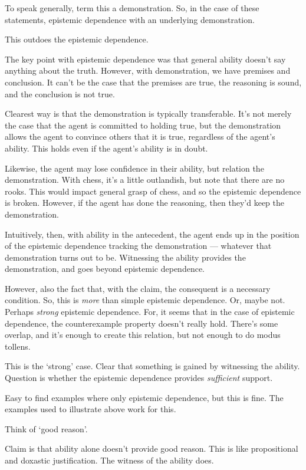 \documentclass[10pt]{article}
\begin{document}
To speak generally, term this a demonstration.
So, in the case of these statements, epistemic dependence with an underlying demonstration.

This outdoes the epistemic dependence.

The key point with epistemic dependence was that general ability doesn't say anything about the truth.
However, with demonstration, we have premises and conclusion.
It can't be the case that the premises are true, the reasoning is sound, and the conclusion is not true.

Clearest way is that the demonstration is typically transferable.
It's not merely the case that the agent is committed to holding true, but the demonstration allows the agent to convince others that it is true, regardless of the agent's ability.
This holds even if the agent's ability is in doubt.

Likewise, the agent may lose confidence in their ability, but relation the demonstration.
With chess, it's a little outlandish, but note that there are no rooks.
This would impact general grasp of chess, and so the epistemic dependence is broken.
However, if the agent has done the reasoning, then they'd keep the demonstration.

Intuitively, then, with ability in the antecedent, the agent ends up in the position of the epistemic dependence tracking the demonstration --- whatever that demonstration turns out to be.
Witnessing the ability provides the demonstration, and goes beyond epistemic dependence.

However, also the fact that, with the claim, the consequent is a necessary condition.
So, this is \emph{more} than simple epistemic dependence.
Or, maybe not.
Perhaps \emph{strong} epistemic dependence.
For, it seems that in the case of epistemic dependence, the counterexample property doesn't really hold.
There's some overlap, and it's enough to create this relation, but not enough to do modus tollens.

This is the `strong' case.
Clear that something is gained by witnessing the ability.
Question is whether the epistemic dependence provides \emph{sufficient} support.

Easy to find examples where only epistemic dependence, but this is fine.
The examples used to illustrate above work for this.

Think of `good reason'.

Claim is that ability alone doesn't provide good reason.
This is like propositional and doxastic justification.
The witness of the ability does.
\end{document}
